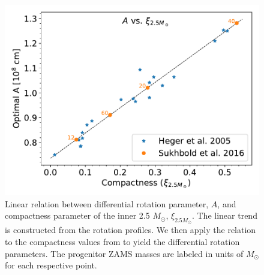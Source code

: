 \documentclass[twocolumn,times]{aastex62}  %
\begin{document}
\begin{figure}[t]
    \centering
    \includegraphics[scale=0.45]{figures/a_vs_compact.pdf}
    \caption{Linear relation between differential rotation parameter, $A$, and compactness parameter of the inner 2.5 $M_\odot$, $\xi_{2.5M_\odot}$.  The linear trend is constructed from the \citet{heger:2005} rotation profiles.  We then apply the relation to the compactness values from \citet{Suk:2016} to yield the differential rotation parameters.  The progenitor ZAMS masses are labeled in units of $M_\odot$ for each respective point.}
    \label{fig:a_vs_comp}
\end{figure}
\end{document}

